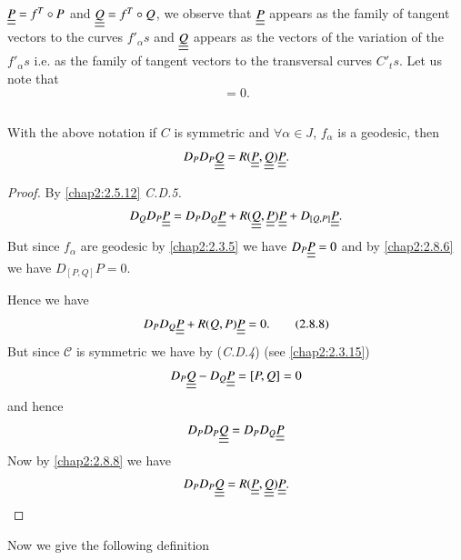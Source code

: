 \setcounter{subsection}{4}
\subsection{}\label{chap2:2.8.5}
$\underline{\underline{P}}=f^{T}\circ P$ and
$\underline{\underline{Q}}=f^{T}\circ Q$, we observe that
$\underline{\underline{P}}$ appears as the family of tangent vectors to
the curves $f'_{\alpha}s$ and $\underline{\underline{Q}}$ appears as the
vectors of the variation of the $f'_{\alpha}s$ i.e. as the family of
tangent vectors to the transversal curves $C'_{t}s$. Let us note that
\begin{equation*}
[P,Q]=0.\tag{2.8.6}\label{chap2:2.8.6}
\end{equation*}

\setcounter{subsection}{6}

\subsection{}\label{chap2:2.8.7}%

\begin{prop*}
With the above notation if $C$ is symmetric and $\forall \alpha\in J$,
$f_{\alpha}$ is a geodesic, then
$$
D_{P}D_{P}\underline{\underline{Q}}=R(\underline{\underline{P}},\underline{\underline{Q}})\underline{\underline{P}}. 
$$
\end{prop*}

\begin{proof}
By \ref{chap2:2.5.12} {\em C.D.5.}
$$
D_{Q}D_{P}\underline{\underline{P}}=D_{P}D_{Q}\underline{\underline{P}}+R(\underline{\underline{Q}},\underline{\underline{P}})\underline{\underline{P}}+D_{[Q,P]}\underline{\underline{P}}. 
$$
But since $f_{\alpha}$ are geodesic by \ref{chap2:2.3.5} we have
$D_{P}\underline{\underline{P}}=0$ and by \eqref{chap2:2.8.6} \pageoriginale we have
$D_{[P,Q]}P=0$.

Hence we have
\begin{equation*}
D_{P}D_{Q}\underline{\underline{P}}+R(Q,P)\underline{\underline{P}}=0.\tag{2.8.8}\label{chap2:2.8.8}
\end{equation*}
But since $\mathcal{C}$ is symmetric we have by ({\em C.D.4}) (see
\eqref{chap2:2.3.15})
$$
D_{P}\underline{\underline{Q}}-D_{Q}\underline{\underline{P}}=[P,Q]=0
$$
and hence
$$
D_{P}D_{P}\underline{\underline{Q}}=D_{P}D_{Q}\underline{\underline{P}}
$$
Now by \eqref{chap2:2.8.8} we have
$$
D_{P}D_{P}\underline{\underline{Q}}=R(\underline{\underline{P}},\underline{\underline{Q}})\underline{\underline{P}}.
$$
\end{proof}

Now we give the following definition

\setcounter{subsection}{8}

\subsection{}\label{chap2:2.8.9}

